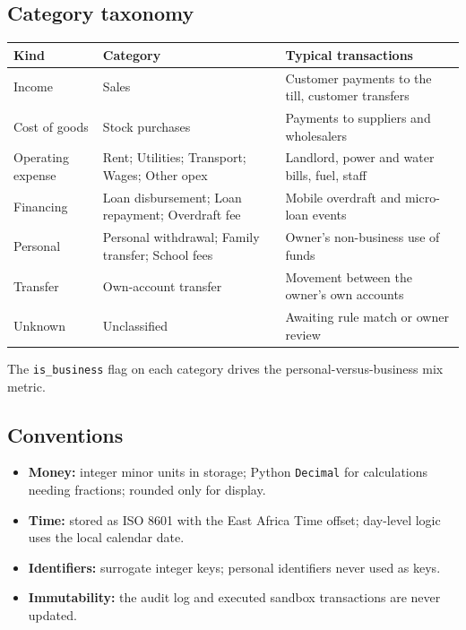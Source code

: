 \documentclass[10pt,a4paper]{article}
\newcommand{\code}[1]{\texttt{\small #1}}
\begin{document}
\subsection{Category taxonomy}
\begin{center}
\begin{tabularx}{\textwidth}{@{}p{3cm}p{3.4cm}Y@{}}
\toprule
\textbf{Kind} & \textbf{Category} & \textbf{Typical transactions}\\
\midrule
Income & Sales & Customer payments to the till, customer transfers\\
Cost of goods & Stock purchases & Payments to suppliers and wholesalers\\
Operating expense & Rent; Utilities; Transport; Wages; Other opex & Landlord, power and water bills, fuel, staff\\
Financing & Loan disbursement; Loan repayment; Overdraft fee & Mobile overdraft and micro-loan events\\
Personal & Personal withdrawal; Family transfer; School fees & Owner's non-business use of funds\\
Transfer & Own-account transfer & Movement between the owner's own accounts\\
Unknown & Unclassified & Awaiting rule match or owner review\\
\bottomrule
\end{tabularx}
\end{center}
The \code{is\_business} flag on each category drives the personal-versus-business mix metric.

\subsection{Conventions}
\begin{itemize}
  \item \textbf{Money:} integer minor units in storage; Python \code{Decimal} for calculations needing fractions; rounded only for display.
  \item \textbf{Time:} stored as ISO 8601 with the East Africa Time offset; day-level logic uses the local calendar date.
  \item \textbf{Identifiers:} surrogate integer keys; personal identifiers never used as keys.
  \item \textbf{Immutability:} the audit log and executed sandbox transactions are never updated.
\end{itemize}
\end{document}
